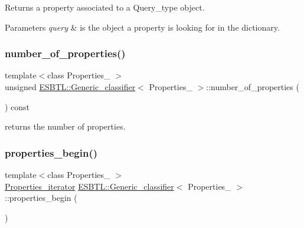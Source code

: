 Returns a property associated to a Query\+\_\+type object. 
\begin{DoxyParams}{Parameters}
{\em query} & is the object a property is looking for in the dictionary. \\
\hline
\end{DoxyParams}
\mbox{\label{structESBTL_1_1Generic__classifier_a1ce2e54d7c1a2c2b8a088457e2c631fb}} 
\subsubsection{\texorpdfstring{number\+\_\+of\+\_\+properties()}{number\_of\_properties()}}
{\footnotesize\ttfamily template$<$class Properties\+\_\+ $>$ \\
unsigned \hyperlink{structESBTL_1_1Generic__classifier}{E\+S\+B\+T\+L\+::\+Generic\+\_\+classifier}$<$ Properties\+\_\+ $>$\+::number\+\_\+of\+\_\+properties (\begin{DoxyParamCaption}{ }\end{DoxyParamCaption}) const\hspace{0.3cm}{\ttfamily [inline]}}

returns the number of properties. \mbox{\label{structESBTL_1_1Generic__classifier_a1ed70ae31493dc92cfec60b4642443f7}} 
\subsubsection{\texorpdfstring{properties\+\_\+begin()}{properties\_begin()}\hspace{0.1cm}{\footnotesize\ttfamily [1/2]}}
{\footnotesize\ttfamily template$<$class Properties\+\_\+ $>$ \\
\hyperlink{structESBTL_1_1Generic__classifier_a5f82ff1a1ee75714d393ded0c3824fe6}{Properties\+\_\+iterator} \hyperlink{structESBTL_1_1Generic__classifier}{E\+S\+B\+T\+L\+::\+Generic\+\_\+classifier}$<$ Properties\+\_\+ $>$\+::properties\+\_\+begin (\begin{DoxyParamCaption}{ }\end{DoxyParamCaption})\hspace{0.3cm}{\ttfamily [inline]}}

